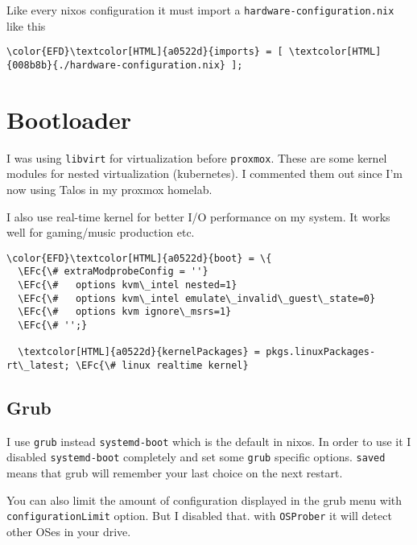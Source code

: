 \documentclass[14pt]{article}
\newcommand{\EFc}[1]{\textcolor{EFc}{#1}} %
\begin{document}
Like every nixos configuration it must import a \texttt{hardware-configuration.nix} like this

\begin{Code}
\begin{Verbatim}
\color{EFD}\textcolor[HTML]{a0522d}{imports} = [ \textcolor[HTML]{008b8b}{./hardware-configuration.nix} ];
\end{Verbatim}
\end{Code}
\section{Bootloader}
\label{sec:org4fca482}
I was using \texttt{libvirt} for virtualization before \texttt{proxmox}. These are some kernel modules for nested virtualization (kubernetes). I commented them out since I'm now using Talos in my proxmox homelab.

I also use real-time kernel for better I/O performance on my system. It works well for gaming/music production etc.

\begin{Code}
\begin{Verbatim}
\color{EFD}\textcolor[HTML]{a0522d}{boot} = \{
  \EFc{\# extraModprobeConfig = ''}
  \EFc{\#   options kvm\_intel nested=1}
  \EFc{\#   options kvm\_intel emulate\_invalid\_guest\_state=0}
  \EFc{\#   options kvm ignore\_msrs=1}
  \EFc{\# '';}

  \textcolor[HTML]{a0522d}{kernelPackages} = pkgs.linuxPackages-rt\_latest; \EFc{\# linux realtime kernel}
\end{Verbatim}
\end{Code}
\subsection{Grub}
\label{sec:org10d928b}
I use \texttt{grub} instead \texttt{systemd-boot} which is the default in nixos. In order to use it I disabled \texttt{systemd-boot} completely and set some \texttt{grub} specific options. \texttt{saved} means that grub will remember your last choice on the next restart.

You can also limit the amount of configuration displayed in the grub menu with \texttt{configurationLimit} option. But I disabled that. with \texttt{OSProber} it will detect other OSes in your drive.
\end{document}
